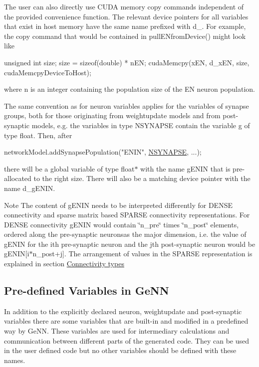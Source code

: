 The user can also directly use C\+U\+D\+A memory copy commands independent of the provided convenience function. The relevant device pointers for all variables that exist in host memory have the same name prefixed with {\ttfamily d\+\_\+}. For example, the copy command that would be contained in {\ttfamily pull\+E\+Nfrom\+Device()} might look like 
\begin{DoxyCode}
\textcolor{keywordtype}{unsigned} \textcolor{keywordtype}{int} size;      
size = \textcolor{keyword}{sizeof}(double) * nEN;
cudaMemcpy(xEN, d\_xEN, size, cudaMemcpyDeviceToHost);
\end{DoxyCode}
 where {\ttfamily n} is an integer containing the population size of the E\+N neuron population.

The same convention as for neuron variables applies for the variables of synapse groups, both for those originating from weightupdate models and from post-\/synaptic models, e.\+g. the variables in type {\ttfamily N\+S\+Y\+N\+A\+P\+S\+E} contain the variable {\ttfamily g} of type float. Then, after 
\begin{DoxyCode}
networkModel.addSynapsePopulation(\textcolor{stringliteral}{"ENIN"}, \hyperlink{modelSpec_8h_a1110b98e1962bdb6bcc86b647b1431d4}{NSYNAPSE}, ...);
\end{DoxyCode}
 there will be a global variable of type {\ttfamily float$\ast$} with the name {\ttfamily g\+E\+N\+I\+N} that is pre-\/allocated to the right size. There will also be a matching device pointer with the name {\ttfamily d\+\_\+g\+E\+N\+I\+N}. \begin{DoxyNote}{Note}
The content of {\ttfamily g\+E\+N\+I\+N} needs to be interpreted differently for D\+E\+N\+S\+E connectivity and sparse matrix based S\+P\+A\+R\+S\+E connectivity representations. For D\+E\+N\+S\+E connectivity {\ttfamily g\+E\+N\+I\+N} would contain \char`\"{}n\+\_\+pre\char`\"{} times \char`\"{}n\+\_\+post\char`\"{} elements, ordered along the pre-\/synaptic neuronsas the major dimension, i.\+e. the value of {\ttfamily g\+E\+N\+I\+N} for the ith pre-\/synaptic neuron and the jth post-\/synaptic neuron would be {\ttfamily g\+E\+N\+I\+N\mbox{[}i$\ast$n\+\_\+post+j\mbox{]}}. The arrangement of values in the S\+P\+A\+R\+S\+E representation is explained in section \hyperlink{sect3_subsect32}{Connectivity types}
\end{DoxyNote}
\hypertarget{ListOfVariables_predefinedVars}{}\subsection{Pre-\/defined Variables in Ge\+N\+N}\label{ListOfVariables_predefinedVars}
In addition to the explicitly declared neuron, weightupdate and post-\/synaptic variables there are some variables that are built-\/in and modified in a predefined way by Ge\+N\+N. These variables are used for intermediary calculations and communication between different parts of the generated code. They can be used in the user defined code but no other variables should be defined with these names.



